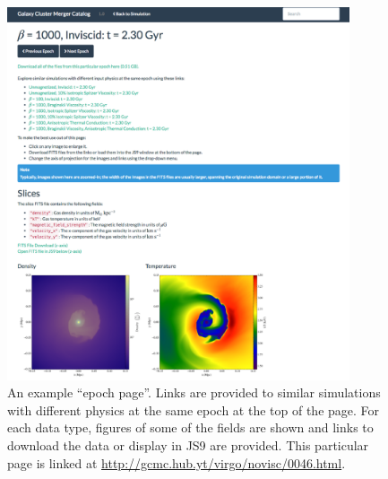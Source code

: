 \documentclass{emulateapj}
\begin{document}
\begin{figure}
\begin{center}
\includegraphics[width=0.9\textwidth]{epoch_page.eps}
\caption{An example ``epoch page''. Links are provided to similar simulations with different physics at the same epoch at the top of the page. For each data type, figures of some of the fields are shown and links to download the data or display in JS9 are provided. This particular page is linked at \url{http://gcmc.hub.yt/virgo/novisc/0046.html}.}
\end{center}
\end{figure}
\end{document}
